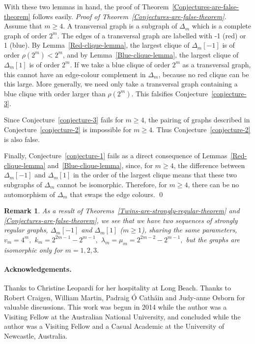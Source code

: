 \documentclass[12pt,a4paper]{article}
\newtheorem*{remark}{Remark}
\newenvironment{proofof}[1]{\noindent\emph{Proof of #1.}}{\qed}
\begin{document}
With these two lemmas in hand, the proof of Theorem~\ref{Conjectures-are-false-theorem} follows easily.
\begin{proofof}{Theorem~\ref{Conjectures-are-false-theorem}}
Assume that $m \geqslant 4$.
A transversal graph is a subgraph of $\varDelta_m$ which is a complete graph of order $2^m$.
The edges of a transversal graph are labelled with -1 (red) or 1 (blue).
By Lemma~\ref{Red-clique-lemma}, the largest clique of $\varDelta_m[-1]$ is of order $\rho(2^m) < 2^m$,
and by Lemma~\ref{Blue-clique-lemma}, the largest clique of $\varDelta_m[1]$ is of order $2^m$.
If we take a blue clique of order $2^m$ as a transversal graph, this cannot have an edge-colour complement
in $\varDelta_m$, because no red clique can be this large.
More generally, we need only take a transversal graph containing a blue clique with order larger than $\rho(2^m)$.
This falsifies Conjecture~\ref{conjecture-3}.

Since Conjecture~\ref{conjecture-3} fails for $m \geqslant 4$, 
the pairing of graphs described in Conjecture~\ref{conjecture-2} is impossible for $m \geqslant 4$.
Thus Conjecture~\ref{conjecture-2} is also false.

Finally, Conjecture~\ref{conjecture-1} fails as a direct consequence of Lemmas~\ref{Red-clique-lemma} and~\ref{Blue-clique-lemma},
since, for $m \geqslant 4$, the difference between $\varDelta_m[-1]$  and $\varDelta_m[1]$ in the order of the largest clique
means that these two subgraphs of $\varDelta_m$ cannot be isomorphic.
Therefore, for $m \geqslant 4$,  there can be no automorphism of $\varDelta_m$ that swaps the edge colours. 
\end{proofof}

\begin{remark}
As a result of Theorems~\ref{Twins-are-strongly-regular-theorem} and \ref{Conjectures-are-false-theorem},
we see that we have two sequences of strongly regular graphs, $\varDelta_m[-1]$ and $\varDelta_m[1]$ ($m \geqslant 1$),
sharing the same parameters, 
$v_m = 4^m,$ $k_m = 2^{2 m - 1} - 2^{m - 1},$ $\lambda_m=\mu_m=2^{2 m - 2} - 2^{m - 1},$
but the graphs are isomorphic only for $m=1, 2, 3$. 
\end{remark}

\paragraph*{Acknowledgements.}

Thanks to Christine Leopardi for her hospitality at Long Beach.
Thanks to Robert Craigen, William Martin,
Padraig {\'O} Cath{\'a}in and Judy-anne Osborn for valuable discussions.
This work was begun in 2014 while the author was a Visiting Fellow at the Australian National University, 
and concluded while the author was a Visiting Fellow and a Casual Academic at the University of Newcastle, Australia.
\end{document}
